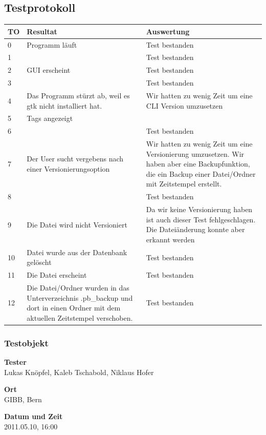 \documentclass[10pt,paper=a4,final]{scrartcl}
\begin{document}
\subsection{Testprotokoll}
\begin{tabularx}{\textwidth}{|l|X|X|}
\hline
\bf TO & \bf Resultat & \bf Auswertung \\ \hline
0 & Programm läuft& Test bestanden\\ \hline
1 & & Test bestanden\\ \hline
2 & GUI erscheint& Test bestanden\\ \hline
3 & & Test bestanden\\ \hline
4 & Das Programm stürzt ab, weil es gtk nicht installiert hat.& Wir hatten zu wenig Zeit um eine CLI Version umzusetzen\\ \hline
5 & Tags  angezeigt& \\ \hline
6 & & Test bestanden\\ \hline
7 & Der User sucht vergebens nach einer Versionierungsoption& Wir hatten zu wenig Zeit um eine Versionierung umzusetzen. Wir haben aber eine Backupfunktion, die ein Backup einer Datei/Ordner mit Zeitstempel erstellt.\\ \hline
8 & & Test bestanden\\ \hline
9 & Die Datei wird nicht Versioniert& Da wir keine Versionierung haben ist auch dieser Test fehlgeschlagen. Die Dateiänderung konnte aber erkannt werden\\ \hline
10 & Datei wurde aus der Datenbank gelöscht& Test bestanden\\ \hline
11 & Die Datei erscheint& Test bestanden\\ \hline
12 & Die Datei/Ordner wurden in das Unterverzeichnis .pb\_backup und dort in einen Ordner mit dem aktuellen Zeitstempel verschoben.& Test bestanden\\ \hline
\end{tabularx}
\subsubsection{Testobjekt}
\begin{description}
\item{\bf Tester}\\
Lukas Kn\"opfel, Kaleb Tschabold, Niklaus Hofer
\item{\bf Ort}\\
GIBB, Bern
\item{\bf Datum und Zeit}\\
2011.05.10, 16:00
\end{description}
\end{document}
